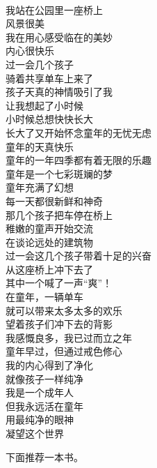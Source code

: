 \begin{poem}[一个永远活在童年的人]
    \begin{multicols}{2}
        \begin{center}~\\
            我站在公园里一座桥上 \\ 风景很美 \\ 我在用心感受临在的美妙 \\ 内心很快乐 \\ 过一会几个孩子 \\ 骑着共享单车上来了 \\ 孩子天真的神情吸引了我 \\ 让我想起了小时候 \\ 小时候总想快快长大 \\ 长大了又开始怀念童年的无忧无虑 \\ 童年的天真快乐 \\ 童年的一年四季都有着无限的乐趣 \\ 童年是一个七彩斑斓的梦 \\ 童年充满了幻想 \\ 每一天都很新鲜和神奇 \\ 那几个孩子把车停在桥上 \\ 稚嫩的童声开始交流 \\ 在谈论远处的建筑物 \\ 过一会这几个孩子带着十足的兴奋 \\ 从这座桥上冲下去了 \\ 其中一个喊了一声“爽”！ \\ 在童年，一辆单车 \\ 就可以带来太多太多的欢乐 \\ 望着孩子们冲下去的背影 \\ 我感慨良多，我已过而立之年 \\ 童年早过，但通过戒色修心 \\ 我的内心得到了净化 \\ 就像孩子一样纯净 \\ 我是一个成年人 \\ 但我永远活在童年 \\ 用最纯净的眼神 \\ 凝望这个世界
        \end{center}
    \end{multicols}
\end{poem}

下面推荐一本书。

